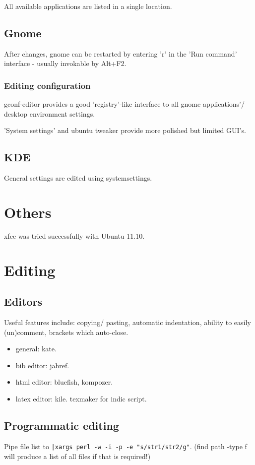 All available applications are listed in a single location.

\subsection{Gnome}
After changes, gnome can be restarted by entering 'r' in the 'Run command' interface - usually invokable by Alt+F2.

\subsubsection{Editing configuration}
gconf-editor provides a good 'registry'-like interface to all gnome applications'/ desktop environment settings.

'System settings' and ubuntu tweaker provide more polished but limited GUI's.

\subsection{KDE}
General settings are edited using systemsettings.

\section{Others}
xfce was tried successfully with Ubuntu 11.10.

\section{Editing}
\subsection{Editors}
Useful features include: copying/ pasting, automatic indentation, ability to easily (un)comment, brackets which auto-close.


\begin{itemize}
\item general: kate.
\item bib editor: jabref.
\item html editor: bluefish, kompozer.
\item latex editor: kile. texmaker for indic script.
\end{itemize}

\subsection{Programmatic editing}
Pipe file list to \verb'|xargs perl -w -i -p -e "s/str1/str2/g"'. (find path -type f will produce a list of all files if that is required!)

